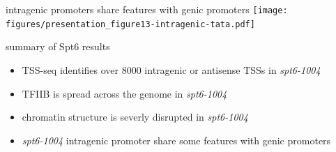 \documentclass[aspectratio=169]{beamer}
\begin{document}
\begin{frame}{intragenic promoters share features with genic promoters}
    \texttt{[image: figures/presentation\_figure13-intragenic-tata.pdf]}
\end{frame}

\begin{frame}{summary of Spt6 results}
    \begin{itemize}
        \item TSS-seq identifies over 8000 intragenic or antisense TSSs in \textit{spt6-1004}
        \item TFIIB is spread across the genome in \textit{spt6-1004}
        \item chromatin structure is severly disrupted in \textit{spt6-1004}
        \item \textit{spt6-1004} intragenic promoter share some features with genic promoters
    \end{itemize}
\end{frame}
\end{document}
